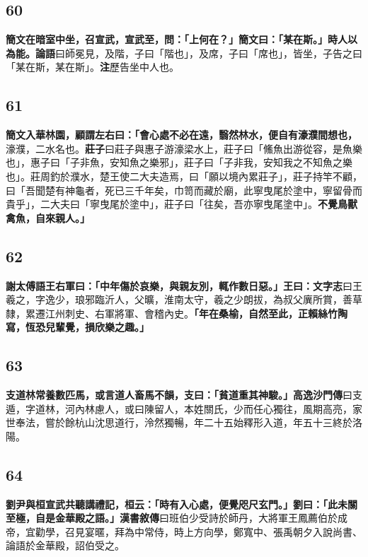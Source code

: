\subsection*{60}

\textbf{簡文在暗室中坐，召宣武，宣武至，問：「上何在？」簡文曰：「某在斯。」時人以為能。}{\footnotesize \textbf{論語}曰師冕見，及階，子曰「階也」，及席，子曰「席也」，皆坐，子告之曰「某在斯，某在斯」。\textbf{注}歷告坐中人也。}

\subsection*{61}

\textbf{簡文入華林園，顧謂左右曰：「會心處不必在遠，翳然林水，便自有濠濮間想也，}{\footnotesize 濠濮，二水名也。\textbf{莊子}曰莊子與惠子游濠梁水上，莊子曰「鯈魚出游從容，是魚樂也」，惠子曰「子非魚，安知魚之樂邪」，莊子曰「子非我，安知我之不知魚之樂也」。莊周釣於濮水，楚王使二大夫造焉，曰「願以境內累莊子」，莊子持竿不顧，曰「吾聞楚有神龜者，死已三千年矣，巾笥而藏於廟，此寧曳尾於塗中，寧留骨而貴乎」，二大夫曰「寧曳尾於塗中」，莊子曰「往矣，吾亦寧曳尾塗中」。}\textbf{不覺鳥獸禽魚，自來親人。」}

\subsection*{62}

\textbf{謝太傅語王右軍曰：「中年傷於哀樂，與親友別，輒作數日惡。」王曰：}{\footnotesize \textbf{文字志}曰王羲之，字逸少，琅邪臨沂人，父曠，淮南太守，羲之少朗拔，為叔父廙所賞，善草隸，累遷江州刺史、右軍將軍、會稽內史。}\textbf{「年在桑榆，自然至此，正賴絲竹陶寫，恆恐兒輩覺，損欣樂之趣。」}

\subsection*{63}

\textbf{支道林常養數匹馬，或言道人畜馬不韻，支曰：「貧道重其神駿。」}{\footnotesize \textbf{高逸沙門傳}曰支遁，字道林，河內林慮人，或曰陳留人，本姓關氏，少而任心獨往，風期高亮，家世奉法，嘗於餘杭山沈思道行，泠然獨暢，年二十五始釋形入道，年五十三終於洛陽。}

\subsection*{64}

\textbf{劉尹與桓宣武共聽講禮記，桓云：「時有入心處，便覺咫尺玄門。」劉曰：「此未關至極，自是金華殿之語。」}{\footnotesize \textbf{漢書敘傳}曰班伯少受詩於師丹，大將軍王鳳薦伯於成帝，宜勸學，召見宴暱，拜為中常侍，時上方向學，鄭寬中、張禹朝夕入說尚書、論語於金華殿，詔伯受之。}

